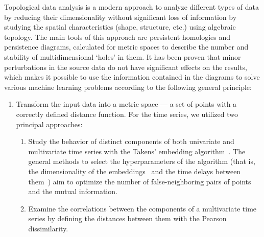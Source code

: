 \documentclass[10pt]{iopart}
\begin{document}
Topological data analysis is a modern approach to analyze different types of data by reducing their dimensionality without significant loss of information by studying the spatial characteristics (shape, structure, etc.) using algebraic topology. The main tools of this approach are persistent homologies and persistence diagrams, calculated for metric spaces to describe the number and stability of multidimensional `holes' in them. It has been proven that minor perturbations in the source data do not have significant effects on the results, which makes it possible to use the information contained in the diagrams to solve various machine learning problems according to the following general principle:

\begin{enumerate}
    \item
        Transform the input data into a metric space --- a set of points with a correctly defined distance function. For the time series, we utilized two principal approaches:

        \begin{enumerate}
            \item
                Study the behavior of distinct components of both univariate and multivariate time series with the Takens' embedding algorithm~\cite{10.1007/BFb0091924,perea2013slidingwindowspersistenceapplication}. The general methods to select the hyperparameters of the algorithm (that is, the dimensionality of the embeddings~\cite{PhysRevA.45.3403} and the time delays between them~\cite{PhysRevA.33.1134}) aim to optimize the number of false-neighboring pairs of points and the mutual information.
            \item 
                Examine the correlations between the components of a multivariate time series by defining the distances between them with the Pearson dissimilarity.
        \end{enumerate}


\end{enumerate}
\end{document}
